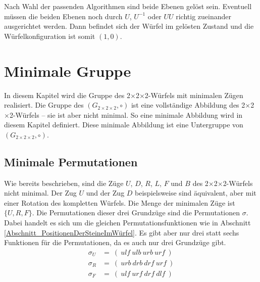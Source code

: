 \documentclass[12pt,a4paper, usenames, dvipsnames]{article}
\theoremstyle{mystyle}
\theoremstyle{definition}
\newcommand{\Gtwo}{\ensuremath{G_{2\times 2\times 2}}}
\newcommand{\Ttwo}{2$\times$2$\times$2-}
\begin{document}
Nach Wahl der passenden Algorithmen sind beide Ebenen gelöst sein. Eventuell müssen die beiden Ebenen noch durch $U$, $U^{-1}$ oder $UU$ richtig zueinander ausgerichtet werden. Dann befindet sich der Würfel im gelösten Zustand und die Würfelkonfiguration ist somit $(1,0)$.

%
%
%
%
%
%
%
%
%
%
%
%
%
%
%
%
%
%
%
%
\newpage

\section{Minimale Gruppe}
\label{Kapitel_MinUntergruppe}

In diesem Kapitel wird die Gruppe des \Ttwo Würfels mit minimalen Zügen realisiert. Die Gruppe des $(\Gtwo, \circ)$ ist eine vollständige Abbildung des \Ttwo Würfels -- sie ist aber nicht minimal. So eine minimale Abbildung wird in diesem Kapitel definiert. Diese minimale Abbildung ist eine Untergruppe von $(\Gtwo, \circ)$.

%
%
%
%
%
%
%
%
%
%
%
%
%
%
%
%
%
%
%
%
\subsection{Minimale Permutationen}

\label{Abschnitt_MinimalePermutationen}

Wie bereits beschrieben, sind die Züge $U$, $D$, $R$, $L$, $F$ und $B$ des \Ttwo Würfels nicht minimal. Der Zug $U$ und der Zug $D$ beispielsweise sind äquivalent, aber mit einer Rotation des kompletten Würfels. 
Die Menge der minimalen Züge ist $\{ U, R, F\}$. Die Permutationen dieser drei Grundzüge sind die Permutationen $\sigma$. Dabei handelt es sich um die gleichen Permutationsfunktionen wie in Abschnitt \ref{Abschnitt_PositionenDerSteineImWürfel}. Es gibt aber nur drei statt sechs Funktionen für die Permutationen, da es auch nur drei Grundzüge gibt.
\begin{align*}
\sigma_U & =\ ( \ \textit{ulf} \ \textit{ulb} \ \textit{urb} \ \textit{urf} \ ) \\
\sigma_R & =\ ( \ \textit{urb} \ \textit{drb} \ \textit{drf} \ \textit{urf} \ ) \\
\sigma_F & =\ ( \ \textit{ulf} \ \textit{urf} \ \textit{drf} \ \textit{dlf} \ ) 
\end{align*}
\end{document}
